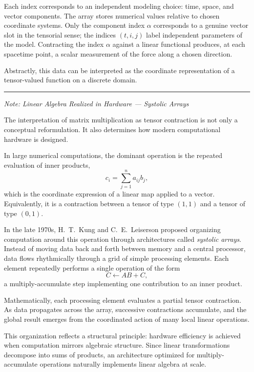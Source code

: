 \medskip

Each index corresponds to an independent modeling choice: time, space, and
vector components.
The array stores numerical values relative to chosen coordinate systems.
Only the component index $\alpha$ corresponds to a genuine vector slot in the
tensorial sense; the indices $(t,i,j)$ label independent parameters of the
model.
Contracting the index $\alpha$ against a linear functional produces, at each
spacetime point, a scalar measurement of the force along a chosen direction.

\medskip

Abstractly, this data can be interpreted as the coordinate representation of a
tensor-valued function on a discrete domain.

\bigskip
\hrule
\medskip

\textit{Note: Linear Algebra Realized in Hardware --- Systolic Arrays
\cite{kung}}

\medskip

The interpretation of matrix multiplication as tensor contraction is not only
a conceptual reformulation.
It also determines how modern computational hardware is designed.

\medskip

In large numerical computations, the dominant operation is the repeated
evaluation of inner products,
\[
c_i = \sum_{j=1}^{n} a_{ij} b_j,
\]
which is the coordinate expression of a linear map applied to a vector.
Equivalently, it is a contraction between a tensor of type $(1,1)$ and a
tensor of type $(0,1)$.

\medskip

In the late 1970s, H.~T.~Kung and C.~E.~Leiserson proposed organizing
computation around this operation through architectures called
\emph{systolic arrays}.
Instead of moving data back and forth between memory and a central processor,
data flows rhythmically through a grid of simple processing elements.
Each element repeatedly performs a single operation of the form
\[
C \leftarrow A B + C,
\]
a multiply-accumulate step implementing one contribution to an inner product.

\medskip

Mathematically, each processing element evaluates a partial tensor contraction.
As data propagates across the array, successive contractions accumulate, and
the global result emerges from the coordinated action of many local linear
operations.

\medskip

This organization reflects a structural principle: hardware efficiency is
achieved when computation mirrors algebraic structure.
Since linear transformations decompose into sums of products, an architecture
optimized for multiply-accumulate operations naturally implements linear algebra
at scale.

